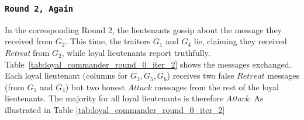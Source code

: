 \documentclass[11pt]{article}
\newcommand{\gen}[1]{\ensuremath{G_{#1}}}
\begin{document}
\subsubsection*{\texttt{\large Round 2, Again}}
\justifying
In the corresponding Round 2, the lieutenants gossip about the message they received from \gen{2}. This time, the traitors $\gen{1}$ and $\gen{4}$ lie, claiming they received \textit{Retreat} from $\gen{2}$, while loyal lieutenants report truthfully. Table~\ref{tab:loyal_commander_round_0_iter_2} shows the messages exchanged. Each loyal lieutenant (columns for $\gen{3}, \gen{5}, \gen{6}$) receives two false $Retreat$ messages (from $\gen{1}$ and $\gen{4}$) but two honest $Attack$ messages from the rest of the loyal lieutenants. The majority for all loyal lieutenants is therefore \textit{Attack}. As illustrated in Table \ref{tab:loyal_commander_round_0_iter_2}
\end{document}
